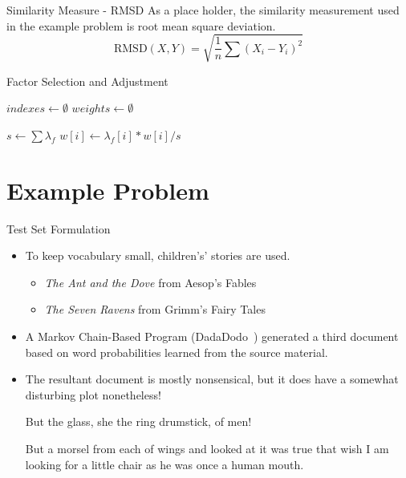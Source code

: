 \documentclass{beamer}
\begin{document}
\begin{frame}{Similarity Measure - RMSD}
    As a place holder, the similarity measurement used in the example problem is
    root mean square deviation.
    \[
        \mathrm{RMSD}(X, Y) = \displaystyle\sqrt{\frac{1}{n}\sum(X_i - Y_i)^2}
    \]
\end{frame}

\begin{frame}{Factor Selection and Adjustment}
\begin{algorithm}[H]
    $indexes \leftarrow \emptyset$\;
    $weights \leftarrow \emptyset$\;
\end{algorithm}

\begin{algorithm}[H]
    $s \leftarrow \sum \lambda_f$\;
     {
        $w[i] \leftarrow \lambda_f[i] * w[i] / s$\;
    }
\end{algorithm}

\end{frame}

\section{Example Problem}
\begin{frame}{Test Set Formulation}
    \begin{itemize}[<+->]
        \item To keep vocabulary small, children's' stories are used.
        \begin{itemize}
            \item {\em The Ant and the Dove} from Aesop's Fables~\cite{aesop}
            \item {\em The Seven Ravens} from Grimm's Fairy Tales~\cite{grimm}
        \end{itemize}
        \item A Markov Chain-Based Program (DadaDodo~\cite{dada}) generated a third document based on word probabilities learned from the source material.
        \item The resultant document is mostly nonsensical, but it does have a somewhat disturbing plot nonetheless!
        \begin{block}{}
But the glass, she the ring drumstick, of men! 

But a morsel from each of wings and looked at it was true that wish I am
looking for a little chair as he was once a human mouth. 
        \end{block}
    \end{itemize}
\end{frame}
\end{document}
